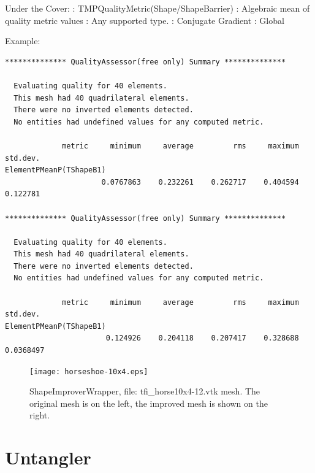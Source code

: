 \noindent Under the Cover: \newline
{}: TMPQualityMetric(Shape/ShapeBarrier) \newline
{}: Algebraic mean of quality metric values \newline
{}: Any supported type. \newline
{}: Conjugate Gradient \newline
{}: Global \newline

\noindent Example: \newline

\begin{verbatim}
************** QualityAssessor(free only) Summary **************

  Evaluating quality for 40 elements.
  This mesh had 40 quadrilateral elements.
  There were no inverted elements detected.
  No entities had undefined values for any computed metric.

             metric     minimum     average         rms     maximum    std.dev.
ElementPMeanP(TShapeB1)
                      0.0767863    0.232261    0.262717    0.404594    0.122781

************** QualityAssessor(free only) Summary **************

  Evaluating quality for 40 elements.
  This mesh had 40 quadrilateral elements.
  There were no inverted elements detected.
  No entities had undefined values for any computed metric.

             metric     minimum     average         rms     maximum    std.dev.
ElementPMeanP(TShapeB1)
                       0.124926    0.204118    0.207417    0.328688   0.0368497
\end{verbatim}

\begin{figure}[htbp]
\begin{center}
    \texttt{[image: horseshoe-10x4.eps]}
    \caption{ShapeImproverWrapper, file: tfi\_horse10x4-12.vtk mesh. The original mesh is on the left, the improved mesh is shown on the right.}
    \label{fig:inverted-hole-1}
\end{center}
\end{figure}

\newpage

\section{Untangler} \label{sec:Untangler}

